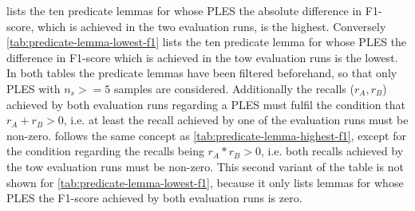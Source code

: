 \documentclass[11pt]{scrreprt}
\begin{document}
{ lists the ten predicate lemmas for whose PLES the absolute difference in F1-score, which is achieved in the two evaluation runs, is the highest. Conversely \cref{tab:predicate-lemma-lowest-f1} lists the ten predicate lemma for whose PLES the difference in F1-score which is achieved in the tow evaluation runs is the lowest. In both tables the predicate lemmas have been filtered beforehand, so that only PLES with \(n_s >= 5\) samples are considered. Additionally the recalls (\(r_A, r_B\)) achieved by both evaluation runs regarding a PLES must fulfil the condition that \(r_A + r_B > 0\), i.e. at least the recall achieved by one of the evaluation runs must be non-zero.  follows the same concept as \cref{tab:predicate-lemma-highest-f1}, except for the condition regarding the recalls being \(r_A * r_B > 0\), i.e. both recalls achieved by the tow evaluation runs must be non-zero. This second variant of the table is not shown for \cref{tab:predicate-lemma-lowest-f1}, because it only lists lemmas for whose PLES the F1-score achieved by both evaluation runs is zero.



}
\end{document}
